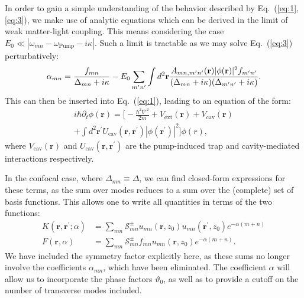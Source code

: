 \documentclass[pra,twocolumn,superscriptaddress]{revtex4-1}
\newcommand{\vect}[1]{\mathbf{#1}}
\newcommand{\transverse}{u}
\newcommand{\wf}{\phi}
\newcommand{\sym}{\mathcal{S}^\pm}
\begin{document}
In order to gain a simple understanding of the behavior described by
Eq.~(\ref{eq:1},\ref{eq:3}), we make use of analytic equations which
can be derived in the limit of weak matter-light coupling.  This means
considering the case $E_0 \ll |\omega_{mn} - \omega_{\text{Pump}} - i
\kappa|$.%
Such a limit is tractable as we may solve Eq.~(\ref{eq:3}) perturbatively:
\begin{displaymath}
  \alpha_{mn} = \frac{f_{mn}}{\Delta_{mn}+i\kappa}
  - E_0 \sum_{m^\prime n^\prime}
  \int d^2{\vect r} \frac{ A_{mn,m^\prime n^\prime}(\vect r) |\wf(\vect r)|^2
    f_{m^\prime n^\prime}}{%
    (\Delta_{mn}+i\kappa)(\Delta_{m^\prime n^\prime}+i\kappa)}.
\end{displaymath}
This can then be inserted into Eq.~(\ref{eq:1}), leading to an equation 
of the form:
\begin{multline}
  i \hbar \partial_t \wf(\vect r) =
  \biggl[- \frac{\hbar^2 \nabla^2}{2m} 
    + V_{\text{ext}}(\vect{r})
    + V_{\text{cav}}(\vect{r})  
  \\+ \int d^2 {\vect r}^\prime
  U_{\text{cav}}(\vect r, \vect r^\prime) |\wf(\vect r^\prime)|^2
  \biggr]\wf(r),
\end{multline}
where $V_{\text{cav}}(\vect{r})$ and $U_{\text{cav}}(\vect r, \vect
r^\prime)$ are the pump-induced trap and cavity-mediated interactions
respectively.  

In the confocal case, where $\Delta_{mn} \equiv \Delta$, we can find
closed-form expressions for these terms, as the sum over modes reduces
to a sum over the (complete) set of basis functions.  This allows one
to write all quantities in terms of the two functions:
\begin{align}
  \label{eq:7}
  K(\vect r, \vect r^\prime;\alpha)
  &= \sum_{mn} \sym_{mn}
  \transverse_{mn}(\vect r,z_0) \transverse_{mn}(\vect r^\prime,z_0)
  e^{-\alpha(m+n)} \\
  \label{eq:8}
  F(\vect{r},\alpha)&= 
  \sum_{mn} \sym_{mn} 
  f_{mn}   \transverse_{mn}(\vect r, z_0) 
  e^{-\alpha(m+n)}.
\end{align}
We have included the symmetry factor explicitly here, as these sums no
longer involve the coefficients $\alpha_{mn}$, which have been
eliminated.  The coefficient $\alpha$ will allow us to incorporate the
phase factors $\vartheta_0$, as well as to provide a cutoff on the
number of transverse modes included.
\end{document}
